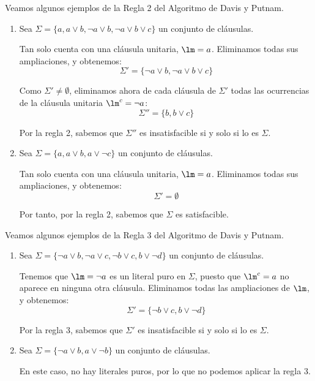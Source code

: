 \begin{ejemplo}
    Veamos algunos ejemplos de la Regla 2 del Algoritmo de Davis y Putnam.
    \begin{enumerate}
        \item Sea $\Sigma = \{a,a\lor b,\lnot a\lor b,\lnot a\lor b\lor c\}$ un conjunto de cláusulas.
        
        Tan solo cuenta con una cláusula unitaria, $\lm=a$. Eliminamos todas sus ampliaciones, y obtenemos:
        \begin{equation*}
            \Sigma' = \{\lnot a\lor b,\lnot a\lor b\lor c\}
        \end{equation*}

        Como $\Sigma'\neq \emptyset$, eliminamos ahora de cada cláusula de $\Sigma'$ todas las ocurrencias de la cláusula unitaria $\lm^c = \lnot a$:
        \begin{equation*}
            \Sigma'' = \{b,b\lor c\}
        \end{equation*}

        Por la regla 2, sabemos que $\Sigma''$ es insatisfacible si y solo si lo es $\Sigma$.

        \item Sea $\Sigma = \{a, a\lor b,a\lor \lnot c\}$ un conjunto de cláusulas.
        
        Tan solo cuenta con una cláusula unitaria, $\lm=a$. Eliminamos todas sus ampliaciones, y obtenemos:
        \begin{equation*}
            \Sigma' = \emptyset
        \end{equation*}

        Por tanto, por la regla 2, sabemos que $\Sigma$ es satisfacible.
    \end{enumerate}
\end{ejemplo}


\begin{ejemplo}
    Veamos algunos ejemplos de la Regla 3 del Algoritmo de Davis y Putnam.
    \begin{enumerate}
        \item Sea $\Sigma = \{\lnot a\lor b, \lnot a\lor c,\lnot b\lor c,b\lor \lnot d\}$ un conjunto de cláusulas.
        
        Tenemos que $\lm=\lnot a$ es un literal puro en $\Sigma$, puesto que $\lm^c=a$ no aparece en ninguna otra cláusula.
        Eliminamos todas las ampliaciones de $\lm$, y obtenemos:
        \begin{equation*}
            \Sigma' = \{\lnot b\lor c,b\lor \lnot d\}
        \end{equation*}

        Por la regla 3, sabemos que $\Sigma'$ es insatisfacible si y solo si lo es $\Sigma$.

        \item Sea $\Sigma = \{\lnot a\lor b, a\lor \lnot b\}$ un conjunto de cláusulas.
        
        En este caso, no hay literales puros, por lo que no podemos aplicar la regla 3.
    \end{enumerate}
\end{ejemplo}


